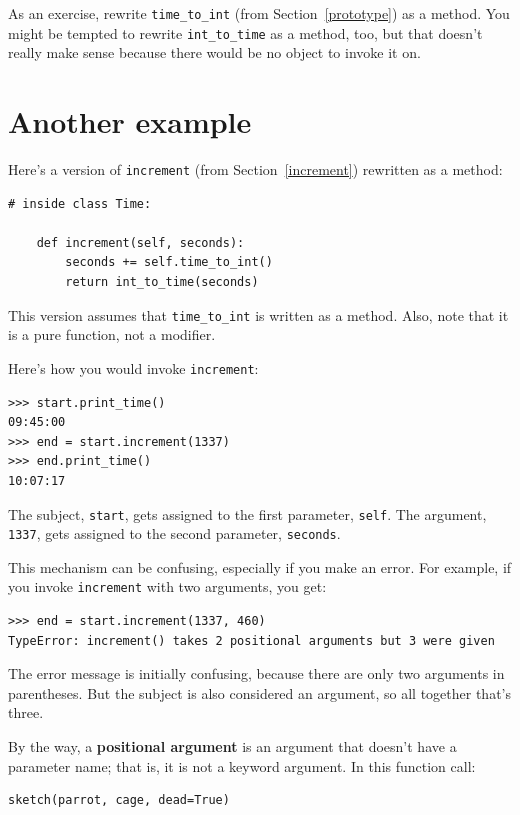 \documentclass[10pt]{book}
\begin{document}
As an exercise, rewrite \verb"time_to_int" (from
Section~\ref{prototype}) as a method.  You might be tempted to
rewrite \verb"int_to_time" as a method, too, but that doesn't
really make sense because there would be no object to invoke
it on.


\section{Another example}

Here's a version of {\tt increment} (from Section~\ref{increment})
rewritten as a method:

\begin{verbatim}
# inside class Time:

    def increment(self, seconds):
        seconds += self.time_to_int()
        return int_to_time(seconds)
\end{verbatim}
%
This version assumes that \verb"time_to_int" is written
as a method.  Also, note that
it is a pure function, not a modifier.

Here's how you would invoke {\tt increment}:

\begin{verbatim}
>>> start.print_time()
09:45:00
>>> end = start.increment(1337)
>>> end.print_time()
10:07:17
\end{verbatim}
%
The subject, {\tt start}, gets assigned to the first parameter,
{\tt self}.  The argument, {\tt 1337}, gets assigned to the
second parameter, {\tt seconds}.

This mechanism can be confusing, especially if you make an error.
For example, if you invoke {\tt increment} with two arguments, you
get:

\begin{verbatim}
>>> end = start.increment(1337, 460)
TypeError: increment() takes 2 positional arguments but 3 were given
\end{verbatim}
%
The error message is initially confusing, because there are
only two arguments in parentheses.  But the subject is also
considered an argument, so all together that's three.

By the way, a {\bf positional argument} is an argument that
doesn't have a parameter name; that is, it is not a keyword
argument.  In this function call:

\begin{verbatim}
sketch(parrot, cage, dead=True)
\end{verbatim}
\end{document}
